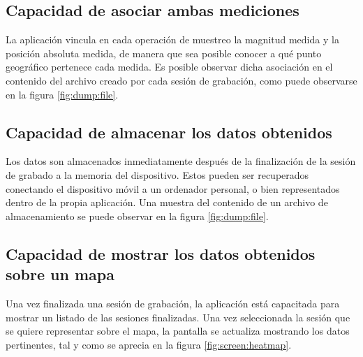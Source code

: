 \subsection{Capacidad de asociar ambas mediciones}
La aplicación vincula en cada operación de muestreo la magnitud medida y la posición absoluta medida, de manera que sea posible conocer a qué punto geográfico pertenece cada medida. Es posible observar dicha asociación en el contenido del archivo creado por cada sesión de grabación, como puede observarse en la figura \ref{fig:dump:file}.

\subsection{Capacidad de almacenar los datos obtenidos}
Los datos son almacenados inmediatamente después de la finalización de la sesión de grabado a la memoria del dispositivo. Estos pueden ser recuperados conectando el dispositivo móvil a un ordenador personal, o bien representados dentro de la propia aplicación. Una muestra del contenido de un archivo de almacenamiento se puede observar en la figura \ref{fig:dump:file}.

\subsection{Capacidad de mostrar los datos obtenidos sobre un mapa}
Una vez finalizada una sesión de grabación, la aplicación está capacitada para mostrar un listado de las sesiones finalizadas. Una vez seleccionada la sesión que se quiere representar sobre el mapa, la pantalla se actualiza mostrando los datos pertinentes, tal y como se aprecia en la figura \ref{fig:screen:heatmap}.

\chapterend{}